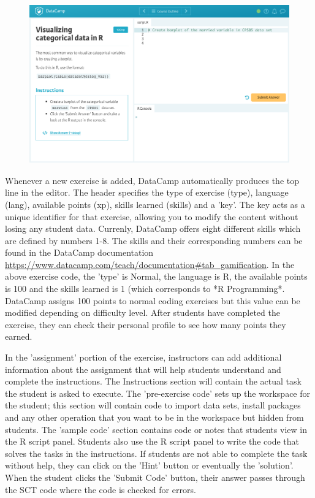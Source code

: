 \documentclass[12pt]{article}
\begin{document}
\begin{figure}[h]
  \includegraphics[scale = 0.19] {preview.jpg}
\end{figure}


Whenever a new exercise is added, DataCamp automatically produces the top line in the editor. The header specifies the type
of exercise (type), language (lang), available points (xp), skills learned (skills) and a 'key'. The key acts as a unique
identifier for that exercise, allowing you to modify the content without losing any student data. Currenly, DataCamp offers
eight different skills which are defined by numbers 1-8. The skills and their corresponding numbers can be found in the DataCamp
documentation \url{https://www.datacamp.com/teach/documentation#tab_gamification}. 
In the above exercise code, the 'type' is Normal, the language is R, the available points is 100 and the skills learned is 1 (which 
corresponds to *R Programming*. DataCamp assigns 100 points to normal coding exercises but this value can be modified depending on
difficulty level. After students have completed the exercise, they can check their personal profile to see how many points they earned.

In the 'assignment' portion of the exercise, instructors can add additional information about the assignment that will help
students understand and complete the instructions. The Instructions section will contain the actual task the student is
asked to execute. The 'pre-exercise code' sets up the workspace for the student; this section will contain code to import
data sets, install packages and any other operation that you want to be in the workspace but hidden from students. The 'sample
code' section contains code or notes that students view in the R script panel. Students also use the R script panel to write
the code that solves the tasks in the instructions. If students are not able to complete the task without help, they can click
on the 'Hint' button or eventually the 'solution'. When the student clicks the 'Submit Code' button, their answer passes through
the SCT code where the code is checked for errors.
\end{document}

